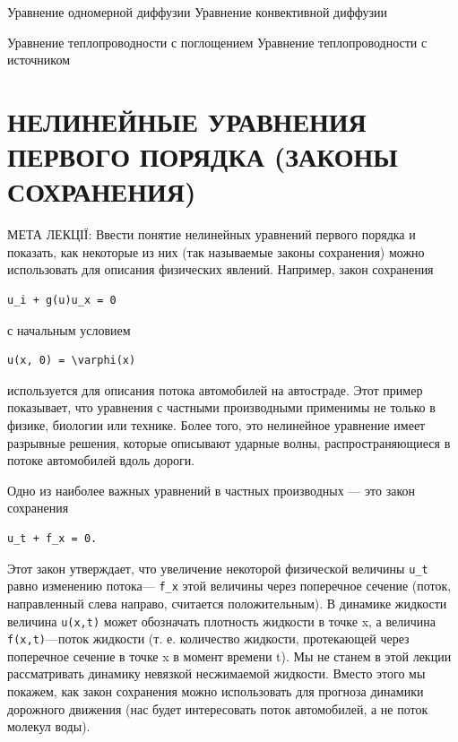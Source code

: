 \documentclass[
  ukrainian,
]{article}
\begin{document}
Уравнение одномерной диффузии Уравнение конвективной диффузии

Уравнение теплопроводности с поглощением Уравнение теплопроводности с
источником

\section{НЕЛИНЕЙНЫЕ УРАВНЕНИЯ ПЕРВОГО ПОРЯДКА (ЗАКОНЫ
СОХРАНЕНИЯ)}\label{ux43dux435ux43bux438ux43dux435ux439ux43dux44bux435-ux443ux440ux430ux432ux43dux435ux43dux438ux44f-ux43fux435ux440ux432ux43eux433ux43e-ux43fux43eux440ux44fux434ux43aux430-ux437ux430ux43aux43eux43dux44b-ux441ux43eux445ux440ux430ux43dux435ux43dux438ux44f}

МЕТА ЛЕКЦІЇ: Ввести понятие нелинейных уравнений первого порядка и
показать, как некоторые из них (так называемые законы сохранения) можно
использовать для описания физических явлений. Например, закон сохранения

\begin{verbatim}
u_i + g(u)u_x = 0
\end{verbatim}

с начальным условием

\begin{verbatim}
u(x, 0) = \varphi(x)
\end{verbatim}

используется для описания потока автомобилей на автостраде. Этот пример
показывает, что уравнения с частными производными применимы не только в
физике, биологии или технике. Более того, это нелинейное уравнение имеет
разрывные решения, которые описывают ударные волны, распространяющиеся в
потоке автомобилей вдоль дороги.

Одно из наиболее важных уравнений в частных производных --- это закон
сохранения

\begin{verbatim}
u_t + f_x = 0.
\end{verbatim}

Этот закон утверждает, что увеличение некоторой физической величины
\texttt{u\_t} равно изменению потока--- \texttt{f\_x} этой величины
через поперечное сечение (поток, направленный слева направо, считается
положительным). В динамике жидкости величина \texttt{u(x,t)} может
обозначать плотность жидкости в точке x, а величина
\texttt{f(x,t)}---поток жидкости (т. е. количество жидкости, протекающей
через поперечное сечение в точке x в момент времени t). Мы не станем в
этой лекции рассматривать динамику невязкой несжимаемой жидкости. Вместо
этого мы покажем, как закон сохранения можно использовать для прогноза
динамики дорожного движения (нас будет интересовать поток автомобилей, а
не поток молекул воды).
\end{document}
